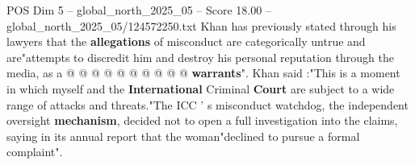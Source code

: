 \begin{textsample}{POS Dim 5 – global\_north\_2025\_05 – Score 18.00 – global\_north\_2025\_05/124572250.txt}
Khan has previously stated through his lawyers that the \textbf{allegations} of misconduct are categorically untrue and are"attempts to discredit him and destroy his personal reputation through the media, as a @ @ @ @ @ @ @ @ @ @ \textbf{warrants}".
Khan said :"This is a moment in which myself and the \textbf{International} Criminal \textbf{Court} are subject to a wide range of attacks and threats."The ICC ' s misconduct watchdog, the independent oversight \textbf{mechanism}, decided not to open a full investigation into the claims, saying in its annual report that the woman"declined to pursue a formal complaint".

\end{textsample}
